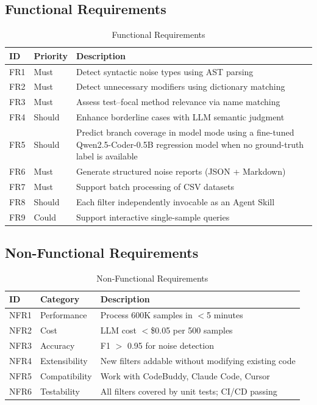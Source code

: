 \documentclass[acmlarge,nonacm,screen]{acmart}
\begin{document}
\subsection{Functional Requirements}

\begin{table}[htbp]
\caption{Functional Requirements}
\label{tab:functional-req}
\begin{tabular}{@{}llp{5.5cm}@{}}
\toprule
\textbf{ID} & \textbf{Priority} & \textbf{Description} \\
\midrule
FR1 & Must & Detect syntactic noise types using AST parsing \\
FR2 & Must & Detect unnecessary modifiers using dictionary matching \\
FR3 & Must & Assess test--focal method relevance via name matching \\
FR4 & Should & Enhance borderline cases with LLM semantic judgment \\
FR5 & Should & Predict branch coverage in model mode using a fine-tuned Qwen2.5-Coder-0.5B regression model when no ground-truth label is available \\
FR6 & Must & Generate structured noise reports (JSON + Markdown) \\
FR7 & Must & Support batch processing of CSV datasets \\
FR8 & Should & Each filter independently invocable as an Agent Skill \\
FR9 & Could & Support interactive single-sample queries \\
\bottomrule
\end{tabular}
\end{table}

\subsection{Non-Functional Requirements}

\begin{table}[htbp]
\caption{Non-Functional Requirements}
\label{tab:nonfunctional-req}
\begin{tabular}{@{}llp{5.5cm}@{}}
\toprule
\textbf{ID} & \textbf{Category} & \textbf{Description} \\
\midrule
NFR1 & Performance & Process 600K samples in $<$5 minutes \\
NFR2 & Cost & LLM cost $<$\$0.05 per 500 samples \\
NFR3 & Accuracy & F1 $>$ 0.95 for noise detection \\
NFR4 & Extensibility & New filters addable without modifying existing code \\
NFR5 & Compatibility & Work with CodeBuddy, Claude Code, Cursor \\
NFR6 & Testability & All filters covered by unit tests; CI/CD passing \\
\bottomrule
\end{tabular}
\end{table}
\end{document}

